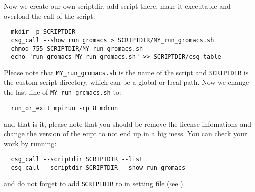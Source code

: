Now we create our own scriptdir, add script there, make it executable and overload the call of the script:
\begin{verbatim}
  mkdir -p SCRIPTDIR
  csg_call --show run gromacs > SCRIPTDIR/MY_run_gromacs.sh
  chmod 755 SCRIPTDIR/MY_run_gromacs.sh
  echo "run gromacs MY_run_gromacs.sh" >> SCRIPTDIR/csg_table
\end{verbatim}
Please note that \texttt{MY\_run\_gromacs.sh} is the name of the script and \texttt{SCRIPTDIR} is the custom script directory, which can be a global or local path.
Now we change the last line of \texttt{MY\_run\_gromacs.sh} to:
\begin{verbatim}
  run_or_exit mpirun -np 8 mdrun
\end{verbatim}
and that is it, please note that you should be remove the license infomations and change the version of the scipt to not end up in a big mess.
You can check your work by running:
\begin{verbatim}
  csg_call --scriptdir SCRIPTDIR --list
  csg_call --scriptdir SCRIPTDIR --show run gromacs
\end{verbatim}
and do not forget to add \texttt{SCRIPTDIR} to  in setting \xml file (see ).

